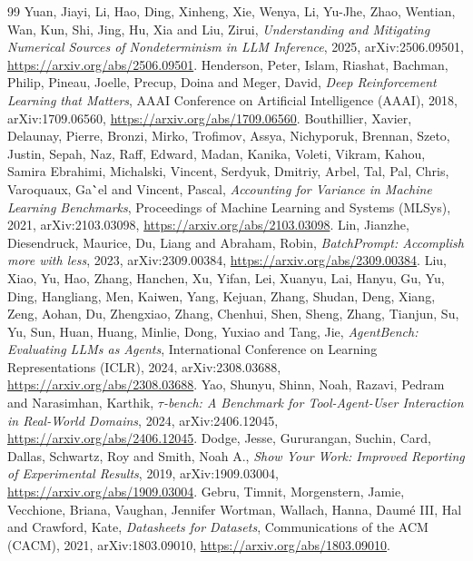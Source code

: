 \documentclass[10pt]{article}
\begin{document}
\begin{thebibliography}{99}
 Yuan, Jiayi, Li, Hao, Ding, Xinheng, Xie, Wenya, Li, Yu-Jhe, Zhao, Wentian, Wan, Kun, Shi, Jing, Hu, Xia and Liu, Zirui, \emph{Understanding and Mitigating Numerical Sources of Nondeterminism in {LLM} Inference}, 2025, arXiv:2506.09501, \url{https://arxiv.org/abs/2506.09501}.
 Henderson, Peter, Islam, Riashat, Bachman, Philip, Pineau, Joelle, Precup, Doina and Meger, David, \emph{Deep Reinforcement Learning that Matters}, AAAI Conference on Artificial Intelligence (AAAI), 2018, arXiv:1709.06560, \url{https://arxiv.org/abs/1709.06560}.
 Bouthillier, Xavier, Delaunay, Pierre, Bronzi, Mirko, Trofimov, Assya, Nichyporuk, Brennan, Szeto, Justin, Sepah, Naz, Raff, Edward, Madan, Kanika, Voleti, Vikram, Kahou, Samira Ebrahimi, Michalski, Vincent, Serdyuk, Dmitriy, Arbel, Tal, Pal, Chris, Varoquaux, Ga{\``e}l and Vincent, Pascal, \emph{Accounting for Variance in Machine Learning Benchmarks}, Proceedings of Machine Learning and Systems (MLSys), 2021, arXiv:2103.03098, \url{https://arxiv.org/abs/2103.03098}.
 Lin, Jianzhe, Diesendruck, Maurice, Du, Liang and Abraham, Robin, \emph{{BatchPrompt}: Accomplish more with less}, 2023, arXiv:2309.00384, \url{https://arxiv.org/abs/2309.00384}.
 Liu, Xiao, Yu, Hao, Zhang, Hanchen, Xu, Yifan, Lei, Xuanyu, Lai, Hanyu, Gu, Yu, Ding, Hangliang, Men, Kaiwen, Yang, Kejuan, Zhang, Shudan, Deng, Xiang, Zeng, Aohan, Du, Zhengxiao, Zhang, Chenhui, Shen, Sheng, Zhang, Tianjun, Su, Yu, Sun, Huan, Huang, Minlie, Dong, Yuxiao and Tang, Jie, \emph{{AgentBench}: Evaluating {LLM}s as Agents}, International Conference on Learning Representations (ICLR), 2024, arXiv:2308.03688, \url{https://arxiv.org/abs/2308.03688}.
 Yao, Shunyu, Shinn, Noah, Razavi, Pedram and Narasimhan, Karthik, \emph{{$\tau$}-bench: A Benchmark for Tool-Agent-User Interaction in Real-World Domains}, 2024, arXiv:2406.12045, \url{https://arxiv.org/abs/2406.12045}.
 Dodge, Jesse, Gururangan, Suchin, Card, Dallas, Schwartz, Roy and Smith, Noah A., \emph{Show Your Work: Improved Reporting of Experimental Results}, 2019, arXiv:1909.03004, \url{https://arxiv.org/abs/1909.03004}.
 Gebru, Timnit, Morgenstern, Jamie, Vecchione, Briana, Vaughan, Jennifer Wortman, Wallach, Hanna, Daum{\'e} III, Hal and Crawford, Kate, \emph{Datasheets for Datasets}, Communications of the ACM (CACM), 2021, arXiv:1803.09010, \url{https://arxiv.org/abs/1803.09010}.
\end{thebibliography}
\end{document}
